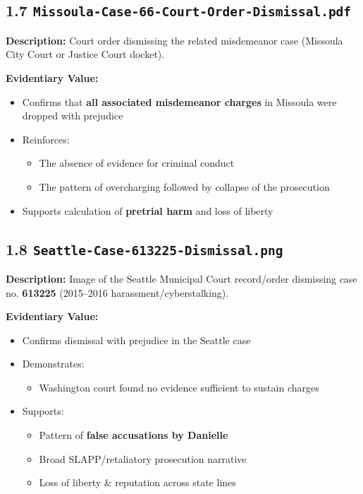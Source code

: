\documentclass[11pt, letterpaper]{article}
\begin{document}
\subsection{1.7 \texttt{Missoula-Case-66-Court-Order-Dismissal.pdf}}

\textbf{Description:} Court order dismissing the related misdemeanor case (Missoula City Court or Justice Court docket).

\textbf{Evidentiary Value:}

\begin{itemize}[leftmargin=*]
  \item Confirms that \textbf{all associated misdemeanor charges} in Missoula were dropped with prejudice
  \item Reinforces:
    \begin{itemize}
      \item The absence of evidence for criminal conduct
      \item The pattern of overcharging followed by collapse of the prosecution
    \end{itemize}
  \item Supports calculation of \textbf{pretrial harm} and loss of liberty
\end{itemize}

\subsection{1.8 \texttt{Seattle-Case-613225-Dismissal.png}}

\textbf{Description:} Image of the Seattle Municipal Court record/order dismissing case no. \textbf{613225} (2015--2016 harassment/cyberstalking).

\textbf{Evidentiary Value:}

\begin{itemize}[leftmargin=*]
  \item Confirms dismissal with prejudice in the Seattle case
  \item Demonstrates:
    \begin{itemize}
      \item Washington court found no evidence sufficient to sustain charges
    \end{itemize}
  \item Supports:
    \begin{itemize}
      \item Pattern of \textbf{false accusations by Danielle}
      \item Broad SLAPP/retaliatory prosecution narrative
      \item Loss of liberty \& reputation across state lines
    \end{itemize}
\end{itemize}
\end{document}
